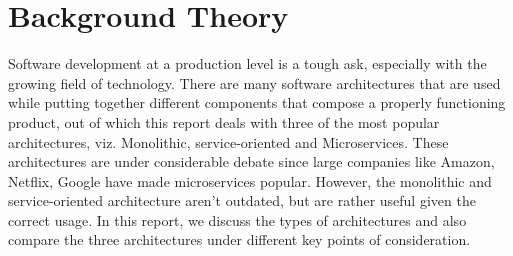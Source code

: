 \documentclass{home_assignment}
\begin{document}
    \clearpage
    \tableofcontents
    \clearpage
    \listoffigures  
    \clearpage
    \listoftables  
    \clearpage
    \section{Background Theory}
    Software development at a production level is a tough ask, especially with the growing field of technology. There are many software architectures that are used while putting together different components that compose a properly functioning product, out of which this report deals with three of the most popular architectures, viz. Monolithic, service-oriented and Microservices. These architectures are under considerable debate since large companies like Amazon, Netflix, Google have made microservices popular. However, the monolithic and service-oriented architecture aren't outdated, but are rather useful given the correct usage. In this report, we discuss the types of architectures and also compare the three architectures under different key points of consideration.
\end{document}
